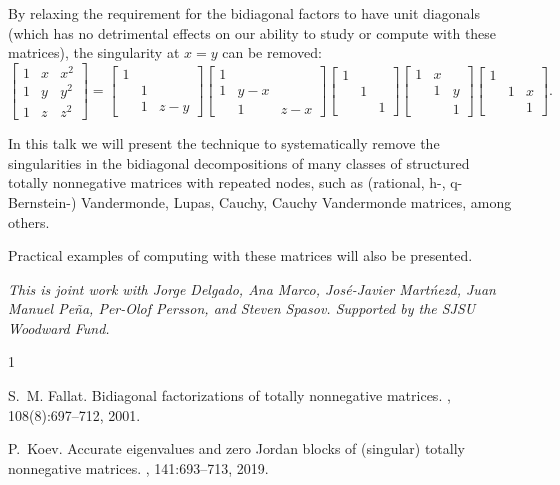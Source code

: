 \documentclass[a4paper]{amsart}
\begin{document}
By relaxing the requirement for the bidiagonal factors to have unit diagonals (which has no detrimental effects on our ability to study or compute with these matrices), the singularity at $x=y$ can be removed:
$$
\left[\begin{matrix} 
1 & x & x^2 \\
1 & y & y^2 \\
1 & z & z^2 
\end{matrix}\right]
=
\left[\begin{matrix}
1 \\
& 1\\
& 1 & z-y
\end{matrix}\right]
\!\!\!\!
\left[\begin{matrix}
1 \\
1 & y-x \\
& 1 & z-x
\end{matrix}\right]
\!\!\!\!
\left[\begin{matrix}
1 \\
& 1 \\
&  & 1
\end{matrix}\right]
\!\!\!\!
\left[\begin{matrix}
1 & x\\
& 1 & y\\
&  & 1
\end{matrix}\right]
\!\!\!\!
\left[\begin{matrix}
1   \\
& 1& x\\
& & 1 
\end{matrix}\right].
$$

In this talk we will present the technique to systematically remove the singularities in the bidiagonal decompositions of many classes of structured totally nonnegative matrices with repeated nodes, such as (rational, h-, q-Bernstein-) Vandermonde, Lupas, Cauchy, Cauchy Vandermonde matrices, among others. 

Practical examples of computing with these matrices will also be presented.

\emph{This is joint work with Jorge Delgado, Ana Marco, Jos\'e-Javier Mart\'nezd, Juan Manuel Pe\~na, Per-Olof Persson, and Steven Spasov.
Supported by the SJSU Woodward Fund.}

\begin{thebibliography}{1}

S.~M. Fallat.
\newblock Bidiagonal factorizations of totally nonnegative matrices.
, 108(8):697--712, 2001.

P.~Koev.
\newblock Accurate eigenvalues and zero {J}ordan blocks of (singular) totally
  nonnegative matrices.
, 141:693--713, 2019.
\end{thebibliography}
\end{document}
